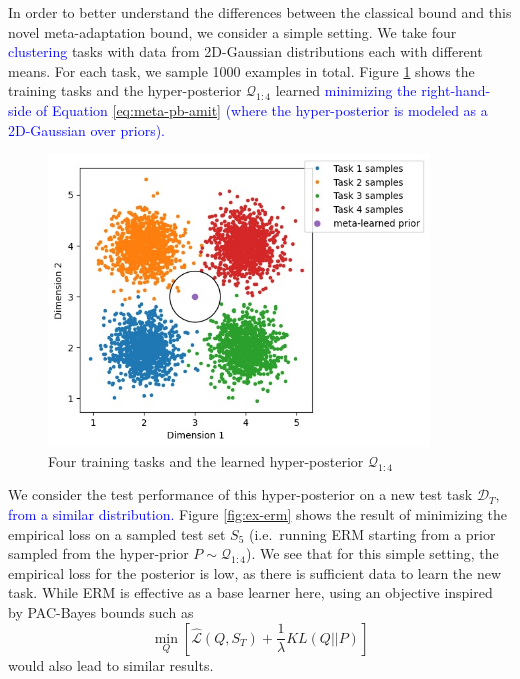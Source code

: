 \documentclass{article}
\theoremstyle{definition}
\newcommand{\LFe}[1]{\textcolor{blue}{#1}}
\begin{document}

In order to better understand the differences between the classical bound and this novel meta-adaptation bound, we consider a simple setting. We take four \LFe{clustering} tasks with data from 2D-Gaussian distributions each with different means. 
For each task, we sample 1000 examples in total.
Figure \ref{fig:ex-baseline} shows the training tasks and the hyper-posterior $\mathcal{Q}_{1:4}$ learned \LFe{minimizing the right-hand-side of Equation \ref{eq:meta-pb-amit} (where the hyper-posterior is modeled as a 2D-Gaussian over priors).}

\begin{figure}
	\centering
	\includegraphics[width=0.9\textwidth]{toy_example_train.JPG}
	\caption{Four training tasks and the learned hyper-posterior $\mathcal{Q}_{1:4}$}
	\label{fig:ex-baseline}
\end{figure}

We consider the test performance of this hyper-posterior on a new test task $\mathcal{D}_T$, \LFe{from a similar distribution.}
 Figure \ref{fig:ex-erm} shows the result of minimizing the empirical loss on a sampled test set $S_5$ (i.e.\ running ERM starting from a prior sampled from the hyper-prior $P\sim \mathcal{Q}_{1:4}$). We see that for this simple setting, the empirical loss for the posterior is low, as there is sufficient data to learn the new task.
While ERM is effective as a base learner here, using an objective inspired by PAC-Bayes bounds such as $$\min_{Q}\left [\hat{\mathcal{L}}(Q, S_T) + \frac{1}{\lambda}KL(Q||P)\right ]$$ would also lead to similar results. 
\end{document}
